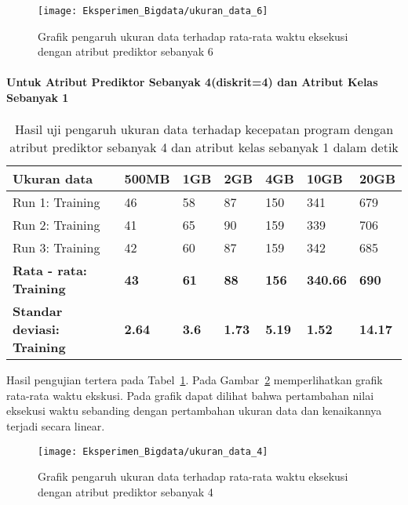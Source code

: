 \begin{figure}[H]
	\centering
	\texttt{[image: Eksperimen\_Bigdata/ukuran\_data\_6]}
	\caption[Grafik pengaruh ukuran data terhadap rata-rata waktu eksekusi dengan atribut prediktor sebanyak 6]{Grafik pengaruh ukuran data terhadap rata-rata waktu eksekusi dengan atribut prediktor sebanyak 6}
	\label{fig:Grafik pengaruh ukuran data terhadap rata-rata waktu eksekusi atr 6}
\end{figure}

\paragraph{Untuk Atribut Prediktor Sebanyak 4(diskrit=4) dan Atribut Kelas Sebanyak 1}

\begin{table}[H]
\label{tab:uji pengaruh ukuran data atr 4}
\centering
\caption{Hasil uji pengaruh ukuran data terhadap kecepatan program dengan atribut prediktor sebanyak 4 dan atribut kelas sebanyak 1 dalam detik}
\begin{tabular}{ | l | l | l | l | l | l | l | }
\hline
Ukuran data & 500MB & 1GB & 2GB & 4GB & 10GB & 20GB \\ \hline \hline
Run 1: Training & 46 & 58 & 87 & 150 & 341 & 679  \\ \hline
Run 2: Training & 41 & 65 & 90 & 159 & 339 & 706  \\ \hline
Run 3: Training & 42 & 60 & 87 & 159 & 342 & 685  \\ \hline
\textbf{Rata - rata: Training} & \textbf{43} & \textbf{61} & \textbf{88} & \textbf{156} & \textbf{340.66} & \textbf{690} \\ \hline
\textbf{Standar deviasi: Training} & \textbf{2.64} & \textbf{3.6} & \textbf{1.73} & \textbf{5.19} & \textbf{1.52} & \textbf{14.17} \\ \hline
\end{tabular}
\end{table}

Hasil pengujian tertera pada Tabel~\ref{tab:uji pengaruh ukuran data atr 4}. Pada Gambar~\ref{fig:Grafik pengaruh ukuran data terhadap rata-rata waktu eksekusi atr 4} memperlihatkan grafik rata-rata waktu ekskusi. Pada grafik dapat dilihat bahwa pertambahan nilai eksekusi waktu sebanding dengan pertambahan ukuran data dan kenaikannya terjadi secara linear.

\begin{figure}[H]
	\centering
	\texttt{[image: Eksperimen\_Bigdata/ukuran\_data\_4]}
	\caption[Grafik pengaruh ukuran data terhadap rata-rata waktu eksekusi dengan atribut prediktor sebanyak 4]{Grafik pengaruh ukuran data terhadap rata-rata waktu eksekusi dengan atribut prediktor sebanyak 4}
	\label{fig:Grafik pengaruh ukuran data terhadap rata-rata waktu eksekusi atr 4}
\end{figure}

